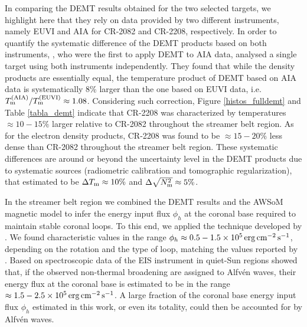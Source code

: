 \documentclass[namedreferences]{solarphysics}
\newcommand{\cm}{{\rm cm}}
\newcommand{\cminvs}{\cm^{-2}}
\newcommand{\erg}{{\rm erg}}
\newcommand{\s}{{\rm s}}
\newcommand{\Tm}{T_{\rm m}}
\newcommand{\Nsqm}{N^2_{{\rm m}}}
\newcommand{\sqravgN}{\sqrt{\Nsqm}}
\begin{document}
\begin{article}
In comparing the DEMT results obtained for the two selected targets, {we highlight here that} they rely on data provided by two different instruments, {namely EUVI and AIA for CR-2082 and CR-2208, respectively.} In order to quantify the systematic difference of the DEMT products based on both instruments, \citet{nuevo_2015}, who were the first to apply DEMT to AIA data, {analysed} a single target using both instruments independently. They found that while the density {products are} essentially equal, the temperature product of DEMT based on AIA data is systematically 8\% larger than the one based on EUVI data, i.e. $\Tm^{\rm(AIA)}/\Tm^{\rm(EUVI)} \approx 1.08$. Considering such correction, Figure \ref{histos_fulldemt} and Table \ref{tabla_demt} indicate that CR-2208 was {characterized by temperatures $\approx 10-15\%$ larger relative to CR-2082} throughout the streamer belt region. As for the electron density products, CR-2208 was found to be $\approx 15-20\%$ less dense than CR-2082 throughout the streamer belt region. These systematic differences are {around or beyond the uncertainty level in the DEMT products due to systematic sources (radiometric calibration and tomographic regularization), that \citet{lloveras_2017} {estimated to be $\Delta\Tm\approx 10\%$ and $\Delta\sqravgN\approx 5\%$}.}

{In the streamer belt region we combined the DEMT results and the AWSoM magnetic model to infer the energy input flux $\phi_h$ at the coronal base required to maintain stable coronal loops. To this end, we applied the technique developed by \citet{maccormack_2017}. We found characteristic values in the range $\phi_h\approx 0.5-1.5 \times 10^5\,\erg\,\cminvs\,\s^{-1}$, depending on the rotation and the type of {loop, matching the values reported by} \citet{maccormack_2017}. Based on spectroscopic data of the EIS instrument in quiet-Sun regions \citet{hahn_2014} showed that, if the observed non-thermal broadening are assigned to Alfvén waves, their energy flux at the coronal base is estimated to be in the range $\approx 1.5-2.5\times 10^5\,\erg\,\cminvs\,\s^{-1}$. A large fraction of the coronal base energy input flux $\phi_h$ estimated in this work, or even its totality, could then be accounted for by Alfvén waves.}


\end{article}
\end{document}

